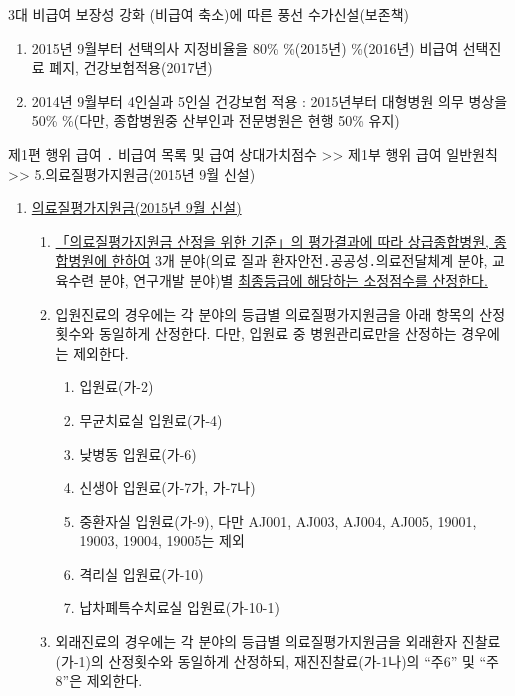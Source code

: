 \begin{hemphsentense}{3대 비급여 보장성 강화 (비급여 축소)에 따른 풍선 수가신설(보존책)}
\begin{enumerate}[1)]\tightlist
\item 2015년 9월부터 선택의사 지정비율을 80\% \%(2015년) \%(2016년) \MVRightarrow 비급여 선택진료 폐지, 건강보험적용(2017년)
\item 2014년 9월부터 4인실과 5인실 건강보험 적용 : 2015년부터 대형병원 의무 병상을 50\% \%(다만, 종합병원중 산부인과 전문병원은 현행 50\% 유지)
\end{enumerate}
\end{hemphsentense}

\begin{mdframed}[linecolor=blue,middlelinewidth=2]  
제1편 행위 급여 ․ 비급여 목록 및 급여 상대가치점수 >> 제1부 행위 급여 일반원칙 >>  5.의료질평가지원금(2015년 9월 신설)
\end{mdframed}
\begin{enumerate}[5.]\tightlist
\item  \uline{의료질평가지원금(2015년 9월 신설)}
	\begin{enumerate}[가.]\tightlist
	\item \uline{「의료질평가지원금 산정을 위한 기준」의 평가결과에 따라 상급종합병원, 종합병원에 한하여} 3개 분야(의료 질과 환자안전․공공성․의료전달체계 분야, 교육수련 분야, 연구개발 분야)별 \uline{최종등급에 해당하는 소정점수를 산정한다. }
	\item 입원진료의 경우에는 각 분야의 등급별 의료질평가지원금을 아래 항목의 산정횟수와 동일하게 산정한다. 다만, 입원료 중 병원관리료만을 산정하는 경우에는 제외한다.
		\begin{enumerate}[(1)]\tightlist
		\item 입원료(가-2)		\item 무균치료실 입원료(가-4)
		\item 낮병동 입원료(가-6)
		\item 신생아 입원료(가-7가, 가-7나)
		\item 중환자실 입원료(가-9), 다만 AJ001, AJ003, AJ004, AJ005, 19001, 19003, 19004, 19005는 제외
		\item 격리실 입원료(가-10)
		\item 납차폐특수치료실 입원료(가-10-1)
		\end{enumerate}
	\item 외래진료의 경우에는 각 분야의 등급별 의료질평가지원금을 외래환자 진찰료(가-1)의 산정횟수와 동일하게 산정하되, 재진진찰료(가-1나)의 “주6” 및 “주8”은 제외한다.
	\end{enumerate}  
\end{enumerate}

